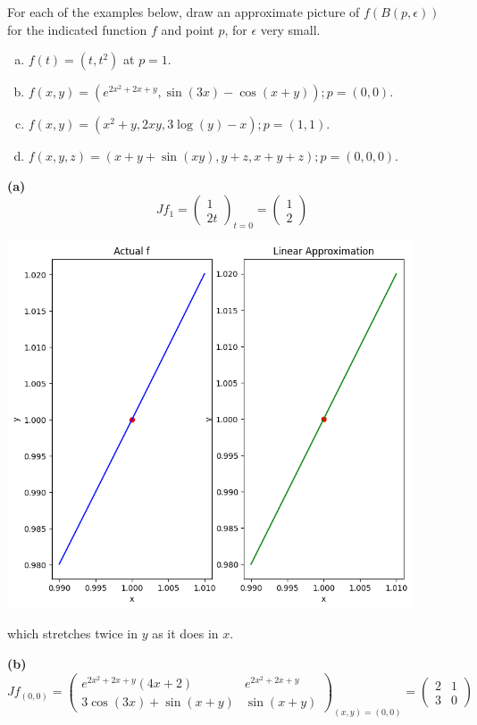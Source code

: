 \documentclass[a4paper, 12pt]{article}
\begin{document}
\begin{problem} 
For each of the examples below, draw an approximate picture of $f(B(p, \epsilon))$   for the indicated function $f$ and point $p$, for $\epsilon$ very small.
\begin{enumerate} [(a)]
    \item $f(t) = (t, t^2)$ at $p = 1$.
    \item $f(x, y) = (e^{2x^2 + 2x + y}, \sin(3x) - \cos(x + y)); p = (0, 0)$.
    \item $f(x, y) = (x^2 + y, 2xy, 3\log(y) - x); p = (1, 1). $
    \item $f(x, y, z) = (x + y + \sin(xy), y + z, x + y + z); p = (0, 0, 0)$.
\end{enumerate}
\end{problem}
\begin{solution}
    \textbf{(a)}
    \[
    Jf_1 = \begin{pmatrix}
    1 \\
    2t
    \end{pmatrix}_{t = 0} = \begin{pmatrix}
    1 \\
    2
    \end{pmatrix}
    \]
    \begin{center}
        \includegraphics[width= 12cm]{./figures/6.8a.png}
    \end{center}
    which stretches twice in $y$ as it does in $x$.

    \textbf{(b)}
    \[
    Jf_{(0, 0)} = \begin{pmatrix}
    e^{2x^2 + 2x + y} (4x + 2) & e^{2x^2 + 2x + y} \\
    3 \cos (3x) + \sin(x +y) & \sin(x+y)
    \end{pmatrix}_{(x, y) = (0, 0)} = \begin{pmatrix}
        2 & 1 \\
        3 & 0
    \end{pmatrix}
    \]
    

\end{solution}
\end{document}
